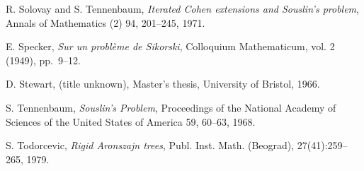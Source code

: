 \documentclass[11pt,a4paper]{report}
\theoremstyle{definition}
\theoremstyle{num.custom-title}
\theoremstyle{custom-title}
\begin{document}
\begin{thebibliography}{9}
R. Solovay and S. Tennenbaum, \emph{Iterated Cohen extensions
and Souslin's problem}, Annals of Mathematics (2) 94, 201--245, 1971.

E. Specker, \emph{Sur un problème de Sikorski}, Colloquium Mathematicum, vol. 2 (1949), pp.\ 9--12.

D. Stewart, (title unknown), Master’s thesis, University of Bristol, 1966.

S. Tennenbaum, \emph{Souslin's Problem}, Proceedings of the National Academy of Sciences of the United States of America 59, 60--63, 1968.

S. Todorcevic, \emph{Rigid Aronszajn trees}, Publ. Inst. Math. (Beograd), 27(41):259–265, 1979.

\end{thebibliography}
\end{document}
